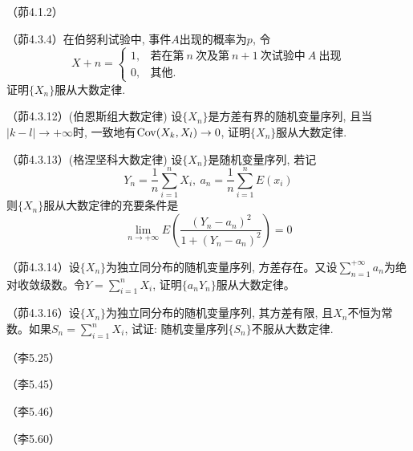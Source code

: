 \begin{problemset}[错题记录]
    \item （茆4.1.2）
    \item （茆4.3.4）在伯努利试验中, 事件$A$出现的概率为$p$, 令
    \[ X+n = \begin{cases}
            1, & \text{若在第} \ n \ \text{次及第} \ n+1 \ \text{次试验中} \ A \ \text{出现} \\
            0, & \text{其他}.
        \end{cases} \]
    证明$\{ X_n \}$服从大数定律.
    \item （茆4.3.12）(伯恩斯组大数定律) 设$\{ X_n \}$是方差有界的随机变量序列, 且当$\lvert k - l \rvert \to +\infty$时, 一致地有$\operatorname{Cov}(X_k, X_l) \to 0$, 证明$\{ X_n \}$服从大数定律.
    \item （茆4.3.13）(格涅坚科大数定律) 设$\{ X_n \}$是随机变量序列, 若记
    \[ Y_n = \frac{1}{n} \sum_{i=1}^n X_i, \ a_n = \frac{1}{n} \sum_{i=1}^n E (x_i) \]
    则$\{ X_n \}$服从大数定律的充要条件是
    \[ \lim_{n \to +\infty} E \left( \frac{( Y_n - a_n )^2}{1 + ( Y_n - a_n )^2} \right) = 0 \]
    \item （茆4.3.14）设$\{ X_n \}$为独立同分布的随机变量序列, 方差存在。又设$\sum_{n=1}^{+\infty} a_n$为绝对收敛级数。令$Y = \sum_{i=1}^n X_i$, 证明$\{ a_n Y_n \}$服从大数定律。
    \item （茆4.3.16）设$\{ X_n \}$为独立同分布的随机变量序列, 其方差有限, 且$X_n$不恒为常数。如果$S_n = \sum_{i=1}^n X_i$, 试证: 随机变量序列$\{ S_n \}$不服从大数定律.
    \item （李5.25）
    \item （李5.45）
    \item （李5.46）
    \item （李5.60）
\end{problemset}